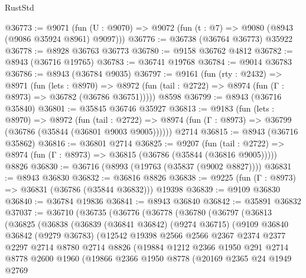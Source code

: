\begin{lexlean}{RustStd}
\begin{coremodule}
@36773 := @9071
    (fun (U : @9070) => @9072 (fun (t : @7) => @9080 (@8943 (@9086 @35924 @8961) @9097)))
@36776 := @36738 (@36764 @36773) @35922
@36778 := @8928 @36763 @36773
@36780 := @9158 @36762 @4812
@36782 := @8943 (@36716 @19765)
@36783 := @36741 @19768
@36784 := @9014 @36783
@36786 := @8943 (@36784 @9035)
@36797 := @9161
    (fun (rty : @2432) =>
    @8971
      (fun (lets : @8970) =>
      @8972 (fun (tail : @2722) => @8974 (fun (Γ : @8973) => @36782 (@36786 @36751)))))
    @8598
@36799 := @8943 (@36716 @35840)
@36801 := @35845 @36746 @35927
@36813 := @9183
    (fun (lets : @8970) =>
    @8972
      (fun (tail : @2722) =>
      @8974 (fun (Γ : @8973) => @36799 (@36786 (@35844 (@36801 @9003 @9005))))))
    @2714
@36815 := @8943 (@36716 @35862)
@36816 := @36801 @2714
@36825 := @9207
    (fun (tail : @2722) => @8974 (fun (Γ : @8973) => @36815 (@36786 (@35844 (@36816 @9005)))))
    @8826
@36830 := @36716 (@8993 (@19763 (@35837 (@9002 @8827))))
@36831 := @8943 @36830
@36832 := @36816 @8826
@36838 := @9225 (fun (Γ : @8973) => @36831 (@36786 (@35844 @36832))) @19398
@36839 := @9109 @36830
@36840 := @36784 @19836
@36841 := @8943 @36840
@36842 := @35891 @36832
@37037 := @36710
    (@36735
      (@36776
        (@36778
          (@36780
            (@36797
              (@36813
                (@36825
                  (@36838
                    (@36839
                      (@36841 @36842)
                      (@9274 @36715)
                      (@9109
                        @36840
                        @36842
                        (@9279 @36783)
                        (@12542
                          @19398
                          @2566
                          @2566
                          @2367
                          @2374
                          @2377
                          @2297
                          @2714
                          @8780
                          @2714
                          @8826
                          (@19884
                            @1212
                            @2366
                            @1950
                            @291
                            @2714
                            @8778
                            @2600
                            @1960
                            (@19866
                              @2366
                              @1950
                              @8778
                              (@20169
                                @2365
                                @24
                                @1949
                                @2769

\end{coremodule}
\end{lexlean}

